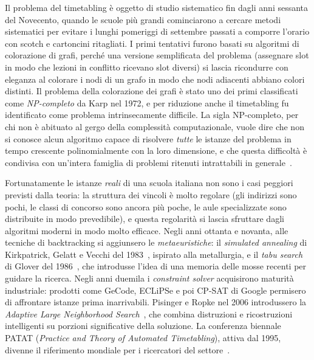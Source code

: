 Il problema del timetabling \`e oggetto di studio sistematico
fin dagli anni sessanta del Novecento, quando le scuole pi\`u
grandi cominciarono a cercare metodi sistematici per evitare
i lunghi pomeriggi di settembre passati a comporre l'orario
con scotch e cartoncini ritagliati. I primi tentativi furono
basati su algoritmi di colorazione di grafi, perch\'e una
versione semplificata del problema (assegnare slot in modo
che lezioni in conflitto ricevano slot diversi) si lascia
ricondurre con eleganza al colorare i nodi di un grafo in
modo che nodi adiacenti abbiano colori distinti. Il problema
della colorazione dei grafi \`e stato uno dei primi
classificati come \emph{NP-completo} da Karp nel 1972, e per
riduzione anche il timetabling fu identificato come problema
intrinsecamente difficile. La sigla NP-completo, per chi non
\`e abituato al gergo della complessit\`a computazionale, vuole
dire che non si conosce alcun algoritmo capace di risolvere
\emph{tutte} le istanze del problema in tempo crescente
polinomialmente con la loro dimensione, e che questa
difficolt\`a \`e condivisa con un'intera famiglia di problemi
ritenuti intrattabili in generale~\parencite{garey1979}.

Fortunatamente le istanze \emph{reali} di una scuola italiana
non sono i casi peggiori previsti dalla teoria: la struttura
dei vincoli \`e molto regolare (gli indirizzi sono pochi, le
classi di concorso sono ancora pi\`u poche, le aule
specializzate sono distribuite in modo prevedibile), e questa
regolarit\`a si lascia sfruttare dagli algoritmi moderni in
modo molto efficace. Negli anni ottanta e novanta, alle
tecniche di backtracking si aggiunsero le \emph{metaeuristiche}:
il \emph{simulated annealing} di Kirkpatrick, Gelatt e
Vecchi del 1983~\parencite{kirkpatrick1983}, ispirato alla
metallurgia, e il \emph{tabu search} di Glover del
1986~\parencite{glover1986}, che introdusse l'idea di una
memoria delle mosse recenti per guidare la ricerca. Negli
anni duemila i \emph{constraint solver} acquisirono maturit\`a
industriale: prodotti come GeCode, ECLiPSe e poi CP-SAT di
Google permisero di affrontare istanze prima inarrivabili.
Pisinger e Ropke nel 2006 introdussero la \emph{Adaptive
Large Neighborhood Search}~\parencite{ropke2006}, che combina
distruzioni e ricostruzioni intelligenti su porzioni
significative della soluzione. La conferenza biennale PATAT
(\emph{Practice and Theory of Automated Timetabling}), attiva
dal 1995, divenne il riferimento mondiale per i ricercatori
del settore~\parencite{patat}.

